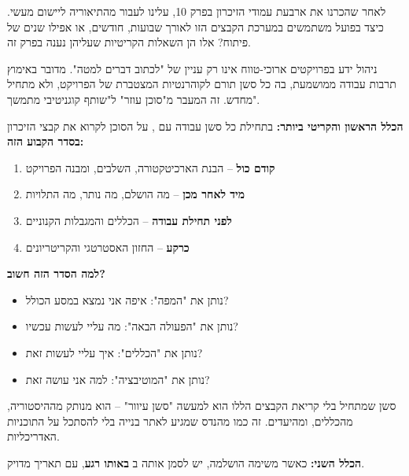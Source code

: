

לאחר שהכרנו את ארבעת עמודי הזיכרון בפרק \num{10}, עלינו לעבור מהתיאוריה ליישום מעשי. כיצד בפועל משתמשים במערכת הקבצים הזו לאורך שבועות, חודשים, או אפילו שנים של פיתוח? אלו הן השאלות הקריטיות שעליהן נענה בפרק זה.

ניהול ידע בפרויקטים ארוכי-טווח אינו רק עניין של "לכתוב דברים למטה". מדובר באימוץ תרבות עבודה ממושמעת, בה כל סשן תורם לקוהרנטיות המצטברת של הפרויקט, ולא מתחיל מחדש. זה המעבר מ"סוכן עוזר" ל"שותף קוגניטיבי מתמשך".


\textbf{הכלל הראשון והקריטי ביותר:} בתחילת כל סשן עבודה עם , על הסוכן לקרוא את קבצי הזיכרון \textbf{בסדר הקבוע הזה:}

\begin{enumerate}
  \item \textbf{ קודם כול} – הבנת הארכיטקטורה, השלבים, ומבנה הפרויקט
  \item \textbf{ מיד לאחר מכן} – מה הושלם, מה נותר, מה התלויות
  \item \textbf{ לפני תחילת עבודה} – הכללים והמגבלות הקנוניים
  \item \textbf{ כרקע} – החזון האסטרטגי והקריטריונים
\end{enumerate}

\textbf{למה הסדר הזה חשוב?}
\begin{itemize}
  \item {} נותן את "המפה": איפה אני נמצא במסע הכולל?
  \item {} נותן את "הפעולה הבאה": מה עליי לעשות עכשיו?
  \item {} נותן את "הכללים": איך עליי לעשות זאת?
  \item {} נותן את "המוטיבציה": למה אני עושה זאת?
\end{itemize}

סשן שמתחיל בלי קריאת הקבצים הללו הוא למעשה "סשן עיוור" – הוא מנותק מההיסטוריה, מהכללים, ומהיעדים. זה כמו מהנדס שמגיע לאתר בנייה בלי להסתכל על התוכניות האדריכליות.


\textbf{הכלל השני:} כאשר משימה הושלמה, יש לסמן אותה ב \textbf{באותו רגע}, עם תאריך מדויק.

